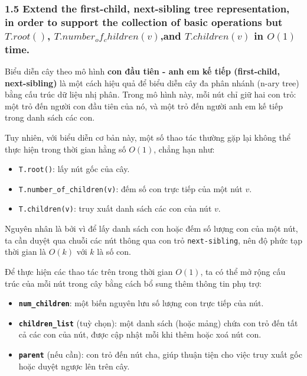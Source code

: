 \documentclass{article}
\begin{document}
	\subsubsection*{1.5 Extend the first-child, next-sibling tree representation, in order to support the collection of basic operations but $T.root()$, $T.number_of_children(v)$,and $T.children(v)$ in $O(1)$ time.}
	
	Biểu diễn cây theo mô hình \textbf{con đầu tiên - anh em kế tiếp (first-child, next-sibling)} là một cách hiệu quả để biểu diễn cây đa phân nhánh (n-ary tree) bằng cấu trúc dữ liệu nhị phân. Trong mô hình này, mỗi nút chỉ giữ hai con trỏ: một trỏ đến người con đầu tiên của nó, và một trỏ đến người anh em kế tiếp trong danh sách các con.
	
	Tuy nhiên, với biểu diễn cơ bản này, một số thao tác thường gặp lại không thể thực hiện trong thời gian hằng số $O(1)$, chẳng hạn như:
	
	\begin{itemize}
		\item \texttt{T.root()}: lấy nút gốc của cây.
		\item \texttt{T.number\_of\_children(v)}: đếm số con trực tiếp của một nút $v$.
		\item \texttt{T.children(v)}: truy xuất danh sách các con của nút $v$.
	\end{itemize}
	
	Nguyên nhân là bởi vì để lấy danh sách con hoặc đếm số lượng con của một nút, ta cần duyệt qua chuỗi các nút thông qua con trỏ \texttt{next-sibling}, nên độ phức tạp thời gian là $O(k)$ với $k$ là số con.
	
	\vspace{0.5em}
	
	Để thực hiện các thao tác trên trong thời gian $O(1)$, ta có thể mở rộng cấu trúc của mỗi nút trong cây bằng cách bổ sung thêm thông tin phụ trợ:
	
	\begin{itemize}
		\item \textbf{\texttt{num\_children}}: một biến nguyên lưu số lượng con trực tiếp của nút.
		\item \textbf{\texttt{children\_list}} (tuỳ chọn): một danh sách (hoặc mảng) chứa con trỏ đến tất cả các con của nút, được cập nhật mỗi khi thêm hoặc xoá nút con.
		\item \textbf{\texttt{parent}} (nếu cần): con trỏ đến nút cha, giúp thuận tiện cho việc truy xuất gốc hoặc duyệt ngược lên trên cây.
	\end{itemize}
	
\end{document}
